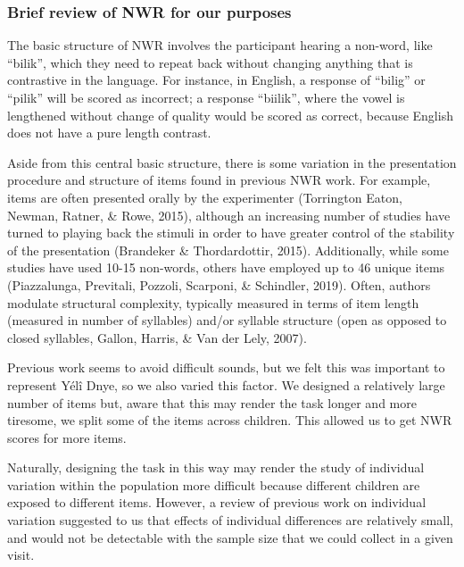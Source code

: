 \documentclass[english,,man,floatsintext]{apa6}
\begin{document}
\subsubsection{Brief review of NWR for our
purposes}\label{brief-review-of-nwr-for-our-purposes}

The basic structure of NWR involves the participant hearing a non-word,
like ``bilik'', which they need to repeat back without changing anything
that is contrastive in the language. For instance, in English, a
response of ``bilig'' or ``pilik'' will be scored as incorrect; a
response ``biilik'', where the vowel is lengthened without change of
quality would be scored as correct, because English does not have a pure
length contrast.

Aside from this central basic structure, there is some variation in the
presentation procedure and structure of items found in previous NWR
work. For example, items are often presented orally by the experimenter
(Torrington Eaton, Newman, Ratner, \& Rowe, 2015), although an
increasing number of studies have turned to playing back the stimuli in
order to have greater control of the stability of the presentation
(Brandeker \& Thordardottir, 2015). Additionally, while some studies
have used 10-15 non-words, others have employed up to 46 unique items
(Piazzalunga, Previtali, Pozzoli, Scarponi, \& Schindler, 2019). Often,
authors modulate structural complexity, typically measured in terms of
item length (measured in number of syllables) and/or syllable structure
(open as opposed to closed syllables, Gallon, Harris, \& Van der Lely,
2007).

Previous work seems to avoid difficult sounds, but we felt this was
important to represent Yélî Dnye, so we also varied this factor. We
designed a relatively large number of items but, aware that this may
render the task longer and more tiresome, we split some of the items
across children. This allowed us to get NWR scores for more items.

Naturally, designing the task in this way may render the study of
individual variation within the population more difficult because
different children are exposed to different items. However, a review of
previous work on individual variation suggested to us that effects of
individual differences are relatively small, and would not be detectable
with the sample size that we could collect in a given visit.
\end{document}
